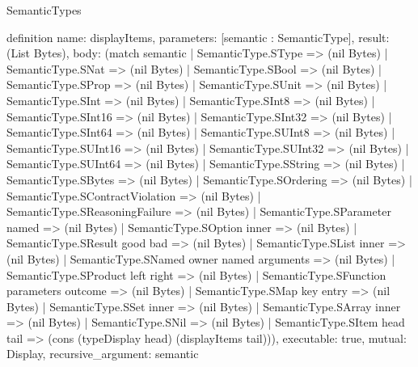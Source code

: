 \begin{lexlean}{SemanticTypes}
\begin{semanticmodule}
definition{
  name: displayItems,
  parameters: [semantic : SemanticType],
  result: (List Bytes),
  body: (match semantic
    | SemanticType.SType => (nil Bytes)
    | SemanticType.SNat => (nil Bytes)
    | SemanticType.SBool => (nil Bytes)
    | SemanticType.SProp => (nil Bytes)
    | SemanticType.SUnit => (nil Bytes)
    | SemanticType.SInt => (nil Bytes)
    | SemanticType.SInt8 => (nil Bytes)
    | SemanticType.SInt16 => (nil Bytes)
    | SemanticType.SInt32 => (nil Bytes)
    | SemanticType.SInt64 => (nil Bytes)
    | SemanticType.SUInt8 => (nil Bytes)
    | SemanticType.SUInt16 => (nil Bytes)
    | SemanticType.SUInt32 => (nil Bytes)
    | SemanticType.SUInt64 => (nil Bytes)
    | SemanticType.SString => (nil Bytes)
    | SemanticType.SBytes => (nil Bytes)
    | SemanticType.SOrdering => (nil Bytes)
    | SemanticType.SContractViolation => (nil Bytes)
    | SemanticType.SReasoningFailure => (nil Bytes)
    | SemanticType.SParameter named => (nil Bytes)
    | SemanticType.SOption inner => (nil Bytes)
    | SemanticType.SResult good bad => (nil Bytes)
    | SemanticType.SList inner => (nil Bytes)
    | SemanticType.SNamed owner named arguments => (nil Bytes)
    | SemanticType.SProduct left right => (nil Bytes)
    | SemanticType.SFunction parameters outcome => (nil Bytes)
    | SemanticType.SMap key entry => (nil Bytes)
    | SemanticType.SSet inner => (nil Bytes)
    | SemanticType.SArray inner => (nil Bytes)
    | SemanticType.SNil => (nil Bytes)
    | SemanticType.SItem head tail => (cons (typeDisplay head) (displayItems tail))),
  executable: true,
  mutual: Display,
  recursive_argument: semantic
}


\end{semanticmodule}
\end{lexlean}
